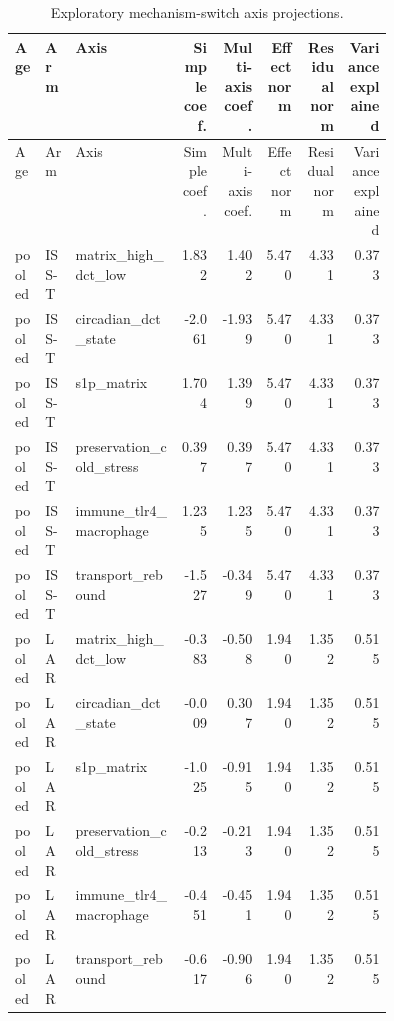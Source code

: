 \documentclass[11pt]{article}
\begin{document}
\begin{landscape}
\scriptsize
\setlength{\tabcolsep}{3pt}
\begin{longtable}{p{0.08\linewidth}p{0.08\linewidth}p{0.28\linewidth}rrrrr}
\caption{Exploratory mechanism-switch axis projections.}\\
\toprule
Age & Arm & Axis & Simple coef. & Multi-axis coef. & Effect norm & Residual norm & Variance explained \\
\midrule
\endfirsthead
\toprule
Age & Arm & Axis & Simple coef. & Multi-axis coef. & Effect norm & Residual norm & Variance explained \\
\midrule
\endhead
pooled & ISS-T & matrix\_high\_dct\_low & 1.832 & 1.402 & 5.470 & 4.331 & 0.373 \\
pooled & ISS-T & circadian\_dct\_state & -2.061 & -1.939 & 5.470 & 4.331 & 0.373 \\
pooled & ISS-T & s1p\_matrix & 1.704 & 1.399 & 5.470 & 4.331 & 0.373 \\
pooled & ISS-T & preservation\_cold\_stress & 0.397 & 0.397 & 5.470 & 4.331 & 0.373 \\
pooled & ISS-T & immune\_tlr4\_macrophage & 1.235 & 1.235 & 5.470 & 4.331 & 0.373 \\
pooled & ISS-T & transport\_rebound & -1.527 & -0.349 & 5.470 & 4.331 & 0.373 \\
pooled & LAR & matrix\_high\_dct\_low & -0.383 & -0.508 & 1.940 & 1.352 & 0.515 \\
pooled & LAR & circadian\_dct\_state & -0.009 & 0.307 & 1.940 & 1.352 & 0.515 \\
pooled & LAR & s1p\_matrix & -1.025 & -0.915 & 1.940 & 1.352 & 0.515 \\
pooled & LAR & preservation\_cold\_stress & -0.213 & -0.213 & 1.940 & 1.352 & 0.515 \\
pooled & LAR & immune\_tlr4\_macrophage & -0.451 & -0.451 & 1.940 & 1.352 & 0.515 \\
pooled & LAR & transport\_rebound & -0.617 & -0.906 & 1.940 & 1.352 & 0.515 \\
\bottomrule
\end{longtable}
\normalsize
\end{landscape}
\end{document}
